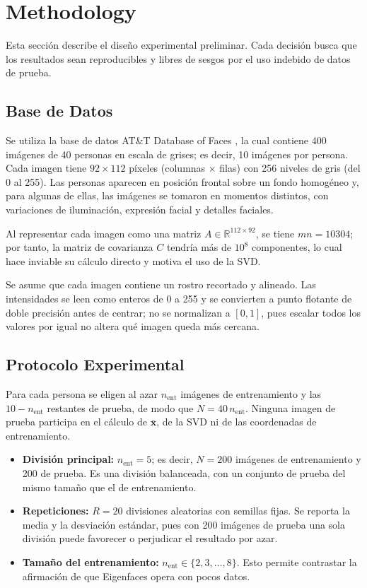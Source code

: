 \section{Methodology}

Esta sección describe el diseño experimental preliminar. Cada decisión busca que los
resultados sean reproducibles y libres de sesgos por el uso indebido de datos de prueba.

\subsection{Base de Datos}

Se utiliza la base de datos AT\&T Database of Faces \cite{samaria1994parameterisation}, la cual
contiene 400 imágenes de 40 personas en escala de grises; es decir, 10 imágenes por persona.
Cada imagen tiene $92 \times 112$ píxeles (columnas $\times$ filas) con 256 niveles de gris
(del 0 al 255). Las personas aparecen en posición frontal sobre un fondo homogéneo y, para
algunas de ellas, las imágenes se tomaron en momentos distintos, con variaciones de
iluminación, expresión facial y detalles faciales.

Al representar cada imagen como una matriz $A \in \mathbb{R}^{112 \times 92}$, se tiene
$mn = 10304$; por tanto, la matriz de covarianza $C$ tendría más de $10^8$ componentes,
lo cual hace inviable su cálculo directo y motiva el uso de la SVD.

Se asume que cada imagen contiene un rostro recortado y alineado. Las intensidades se leen
como enteros de 0 a 255 y se convierten a punto flotante de doble precisión antes de
centrar; no se normalizan a $[0,1]$, pues escalar todos los valores por igual no altera qué
imagen queda más cercana.


\subsection{Protocolo Experimental}

Para cada persona se eligen al azar $n_{\text{ent}}$ imágenes de entrenamiento y las
$10 - n_{\text{ent}}$ restantes de prueba, de modo que $N = 40\,n_{\text{ent}}$. Ninguna
imagen de prueba participa en el cálculo de $\bar{\mathbf{x}}$, de la SVD ni de las
coordenadas de entrenamiento.
\begin{itemize}
    \item \textbf{División principal:} $n_{\text{ent}} = 5$; es decir, $N = 200$ imágenes
    de entrenamiento y 200 de prueba. Es una división balanceada, con un conjunto de prueba
    del mismo tamaño que el de entrenamiento.
    \item \textbf{Repeticiones:} $R = 20$ divisiones aleatorias con semillas fijas.
    Se reporta la media y la desviación estándar, pues con 200 imágenes de prueba una
    sola división puede favorecer o perjudicar el resultado por azar.
    \item \textbf{Tamaño del entrenamiento:} $n_{\text{ent}} \in \{2, 3, \dots, 8\}$.
    Esto permite contrastar la afirmación de que Eigenfaces opera con pocos datos.
\end{itemize}

